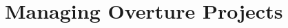 \documentclass{overturerepchap}
\newcommand{\url}[1]{\texttt{#1}}
\begin{document}

\chapter{Managing Overture Projects}\label{sec:projects}
\end{document}
